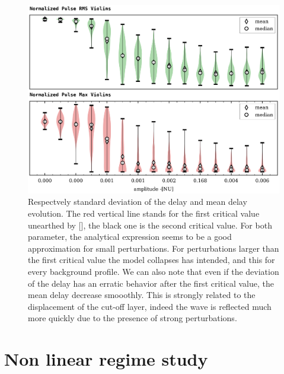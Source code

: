 \documentclass[11pt,a4paper]{report}
\begin{document}
\begin{figure}[H]
    \centering
    \includegraphics[width=1\linewidth]{./figures/pulse_overview.png}
    \caption{Respectvely standard deviation of the delay and mean delay evolution. The red vertical line stands for the first critical value unearthed by [], the black one is the second critical value. For both parameter,
        the analytical expression seems to be a good approximation for small perturbations. For perturbations larger than the first critical value the model collapses has intended, and this for every background profile. We can also note that even if the deviation of the delay has an erratic behavior after the first critical value, the mean delay decrease smooothly.
        This is strongly related to the displacement of the cut-off layer, indeed the wave is reflected much more quickly due to the presence of strong perturbations.}
    \label{fig:barrier}
\end{figure}

\chapter{Non linear regime study}

\newpage
\end{document}
